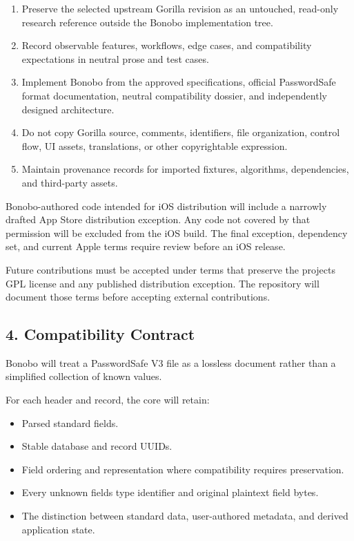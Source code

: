 \documentclass[
  letterpaper,
]{article}
\providecommand{\tightlist}{%
  \setlength{\itemsep}{0pt}\setlength{\parskip}{0pt}}
\begin{document}
\begin{enumerate}
\def\labelenumi{\arabic{enumi}.}
\tightlist
\item
  Preserve the selected upstream Gorilla revision as an untouched, read-only research reference outside the Bonobo
  implementation tree.
\item
  Record observable features, workflows, edge cases, and compatibility expectations in neutral prose and test cases.
\item
  Implement Bonobo from the approved specifications, official PasswordSafe format documentation, neutral compatibility
  dossier, and independently designed architecture.
\item
  Do not copy Gorilla source, comments, identifiers, file organization, control flow, UI assets, translations, or other
  copyrightable expression.
\item
  Maintain provenance records for imported fixtures, algorithms, dependencies, and third-party assets.
\end{enumerate}

Bonobo-authored code intended for iOS distribution will include a narrowly drafted App Store distribution exception. Any
code not covered by that permission will be excluded from the iOS build. The final exception, dependency set, and
current Apple terms require review before an iOS release.

Future contributions must be accepted under terms that preserve the project\textquotesingle s GPL license and any
published distribution exception. The repository will document those terms before accepting external contributions.

\subsection{4. Compatibility Contract}\label{4-compatibility-contract}

Bonobo will treat a PasswordSafe V3 file as a lossless document rather than a simplified collection of known values.

For each header and record, the core will retain:

\begin{itemize}
\tightlist
\item
  Parsed standard fields.
\item
  Stable database and record UUIDs.
\item
  Field ordering and representation where compatibility requires preservation.
\item
  Every unknown field\textquotesingle s type identifier and original plaintext field bytes.
\item
  The distinction between standard data, user-authored metadata, and derived application state.
\end{itemize}
\end{document}
